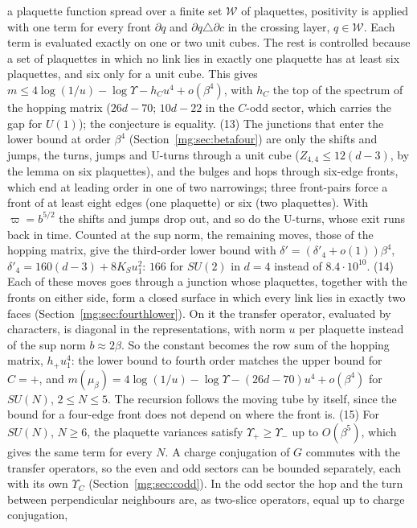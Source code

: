 \documentclass[11pt,a4paper]{article}
\theoremstyle{definition}
\theoremstyle{remark}
\begin{document}
a plaquette function spread over a finite set $\mathcal W$ of plaquettes, positivity is applied with one term for every front $\partial q$ and
$\partial q\triangle\partial c$ in the crossing layer, $q\in\mathcal W$.
Each term is evaluated exactly on one or two unit cubes. The rest is controlled because a set of plaquettes in which no link lies in exactly one plaquette has
at least six plaquettes, and six only for a unit cube. This gives $m\le4\log(1/u)-\log\Upsilon-h_Cu^4+o(\beta^4)$, with $h_C$ the top of the spectrum of the
hopping matrix ($26d-70$; $10d-22$ in the $C$-odd sector, which carries the gap for $U(1)$); the conjecture is equality. (13) The junctions that enter
the lower bound at order $\beta^4$ (Section~\ref{mg:sec:betafour}) are only the shifts and jumps, the turns, jumps and U-turns through a unit cube
($Z_{4,4}\le12(d-3)$, by the lemma on six plaquettes), and the bulges and hops through six-edge fronts, which end at leading order in one of two narrowings;
three front-pairs force a front of at least eight edges (one plaquette) or six (two plaquettes). With $\varpi=b^{5/2}$ the shifts and jumps drop out, and so do the
U-turns, whose exit runs back in time. Counted at the sup norm, the remaining moves, those of the hopping matrix, give the third-order lower bound with
$\delta'=(\delta'_4+o(1))\beta^4$, $\delta'_4=160(d-3)+8K_Su_1^2$: $166$ for $SU(2)$ in $d=4$ instead of $8.4\cdot10^{10}$. (14) Each of these moves goes through a junction
whose plaquettes, together with the fronts on either side, form a closed surface in which every link lies in exactly two faces (Section~\ref{mg:sec:fourthlower}).
On it the transfer operator, evaluated by characters, is diagonal in the representations, with norm $u$ per plaquette instead of the sup norm $b\approx2\beta$. So
the constant becomes the row sum of the hopping matrix, $h_+u_1^4$: the lower bound to fourth order matches the upper bound for $C=+$, and
$m(\mu_\beta)=4\log(1/u)-\log\Upsilon-(26d-70)u^4+o(\beta^4)$ for $SU(N)$, $2\le N\le5$. The recursion follows the moving tube by itself, since the bound for a four-edge
front does not depend on where the front is. (15) For $SU(N)$, $N\ge6$, the plaquette variances satisfy $\Upsilon_+\ge\Upsilon_-$ up to $O(\beta^5)$, which gives the same term for every
$N$. A charge conjugation of $G$ commutes with the transfer operators, so the even and odd sectors can be bounded separately, each with its own $\Upsilon_C$
(Section~\ref{mg:sec:codd}). In the odd sector the hop and the turn between perpendicular neighbours are, as two-slice operators, equal up to charge conjugation,
\end{document}
